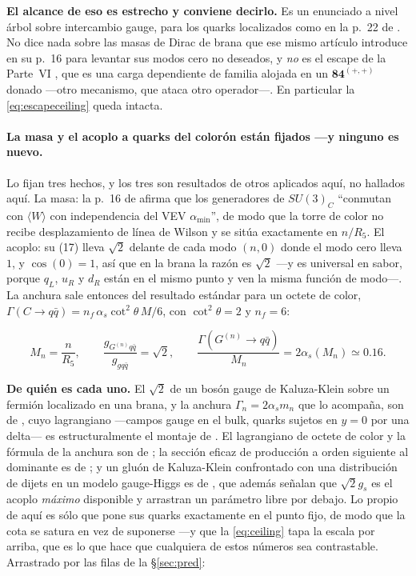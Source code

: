 \documentclass[11pt,a4paper]{article}
\newcommand{\su}[1]{SU(#1)}
\newcommand{\rep}[1]{\mathbf{#1}}
\newenvironment{keyeq}
  {\begin{center}\setlength{\fboxsep}{9pt}\setlength{\fboxrule}{0.8pt}%
   \begin{lrbox}{\keyeqbox}\begin{minipage}{0.88\textwidth}}
  {\end{minipage}\end{lrbox}%
   \fcolorbox{hdrblue!55}{hdrblue!6}{\usebox{\keyeqbox}}\end{center}}
\begin{document}
\noindent\textbf{El alcance de eso es estrecho y conviene decirlo.} Es un enunciado a nivel árbol
sobre intercambio gauge, para los quarks localizados como en la p.~22 de \cite{KM25}. No dice nada
sobre las masas de Dirac de brana que ese mismo artículo introduce en su p.~16 para levantar sus
modos cero no deseados, y \emph{no} es el escape de la Parte~VI \cite{PartVI}, que es una carga
dependiente de familia alojada en un $\rep{84}^{(+,+)}$ donado ---otro mecanismo, que ataca otro
operador---. En particular la \eqref{eq:escapeceiling} queda intacta.

\paragraph{La masa y el acoplo a quarks del colorón están fijados ---y ninguno es nuevo.} Lo fijan tres hechos, y los
tres son resultados de otros aplicados aquí, no hallados aquí. La masa: la p.~16 de
\cite{KM25} afirma que los generadores de $\su3_C$ ``conmutan con $\langle W\rangle$ con
independencia del VEV $\alpha_{\min}$'', de modo que la torre de color no recibe desplazamiento
de línea de Wilson y se sitúa exactamente en $n/R_5$. El acoplo: su (17) lleva $\sqrt2$ delante de
cada modo $(n,0)$ donde el modo cero lleva $1$, y $\cos(0)=1$, así que en la brana la razón es
$\sqrt2$ ---y es universal en sabor, porque $q_L$, $u_R$ y $d_R$ están en el mismo punto y ven la
misma función de modo---. La anchura sale entonces del resultado estándar para un octete de color,
$\Gamma(C\to q\bar q)=n_f\,\alpha_s\cot^2\theta\,M/6$, con $\cot^2\theta=2$ y $n_f=6$:

\begin{keyeq}
\begin{equation}\label{eq:coloron}
  M_n=\frac{n}{R_5},
  \qquad
  \frac{g_{G^{(n)}q\bar q}}{g_{gq\bar q}}=\sqrt2,
  \qquad
  \frac{\Gamma(G^{(n)}\!\to q\bar q)}{M_n}=2\alpha_s(M_n)\simeq0.16 .
\end{equation}
\end{keyeq}

\noindent \textbf{De quién es cada uno.} El $\sqrt2$ de un bosón gauge de Kaluza-Klein sobre un
fermión localizado en una brana, y la anchura $\Gamma_n=2\alpha_s m_n$ que lo acompaña, son de
\cite{DMN01}, cuyo lagrangiano ---campos gauge en el bulk, quarks sujetos en $y=0$ por una delta---
es estructuralmente el montaje de \cite{KM25}. El lagrangiano de octete de color y la fórmula de la
anchura son de \cite{Simmons97}; la sección eficaz de producción a orden siguiente al dominante es
de \cite{Chivukula13}; y un gluón de Kaluza-Klein confrontado con una distribución de dijets en un
modelo gauge-Higgs es de \cite{KS16}, que además señalan que $\sqrt2 g_s$ es el acoplo \emph{máximo}
disponible y arrastran un parámetro libre por debajo. Lo propio de aquí es sólo que \cite{KM25}
pone sus quarks exactamente en el punto fijo, de modo que la cota se satura en vez de suponerse
---y que la \eqref{eq:ceiling} tapa la escala por arriba, que es lo que hace que cualquiera de
estos números sea contrastable. Arrastrado por las filas de la \S\ref{sec:pred}:
\end{document}
